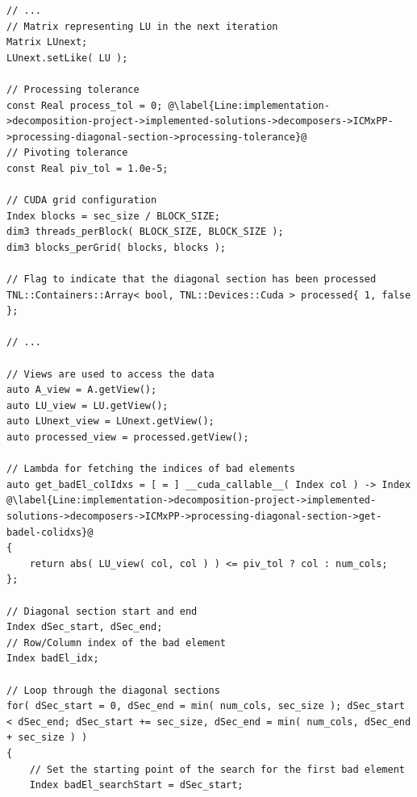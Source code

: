 \begin{lstlisting}[caption={An excerpt from the definition of the overloaded \code{decompose()} method for the ICM\_\textit{x}PP decomposer. The excerpt highlights how the processing of a diagonal section is implemented. For clarity, variables used in the code are declared and documented. The \code{DSecCompute\_kernel()} and \code{DSecAssign\_kernel()} kernels compute and assign values of the diagonal section, respectively. The kernels are presented separately in Listings~\ref{Listing:implementation->decomposition-project->implemented-solutions->decomposers->ICMxPP->kernels->diagonal-compute} and \ref{Listing:implementation->decomposition-project->implemented-solutions->decomposers->ICMxPP->kernels->diagonal-assign}.},label={Listing:implementation->decomposition-project->implemented-solutions->decomposers->ICMxPP->processing-diagonal-section},escapechar=@]
// ...
// Matrix representing LU in the next iteration
Matrix LUnext;
LUnext.setLike( LU );

// Processing tolerance
const Real process_tol = 0; @\label{Line:implementation->decomposition-project->implemented-solutions->decomposers->ICMxPP->processing-diagonal-section->processing-tolerance}@
// Pivoting tolerance
const Real piv_tol = 1.0e-5;

// CUDA grid configuration
Index blocks = sec_size / BLOCK_SIZE;
dim3 threads_perBlock( BLOCK_SIZE, BLOCK_SIZE );
dim3 blocks_perGrid( blocks, blocks );

// Flag to indicate that the diagonal section has been processed
TNL::Containers::Array< bool, TNL::Devices::Cuda > processed{ 1, false };

// ...

// Views are used to access the data
auto A_view = A.getView();
auto LU_view = LU.getView();
auto LUnext_view = LUnext.getView();
auto processed_view = processed.getView();

// Lambda for fetching the indices of bad elements
auto get_badEl_colIdxs = [ = ] __cuda_callable__( Index col ) -> Index @\label{Line:implementation->decomposition-project->implemented-solutions->decomposers->ICMxPP->processing-diagonal-section->get-badel-colidxs}@
{
	return abs( LU_view( col, col ) ) <= piv_tol ? col : num_cols;
};

// Diagonal section start and end
Index dSec_start, dSec_end;
// Row/Column index of the bad element
Index badEl_idx;

// Loop through the diagonal sections
for( dSec_start = 0, dSec_end = min( num_cols, sec_size ); dSec_start < dSec_end; dSec_start += sec_size, dSec_end = min( num_cols, dSec_end + sec_size ) )
{
	// Set the starting point of the search for the first bad element
	Index badEl_searchStart = dSec_start;
	

\end{lstlisting}
